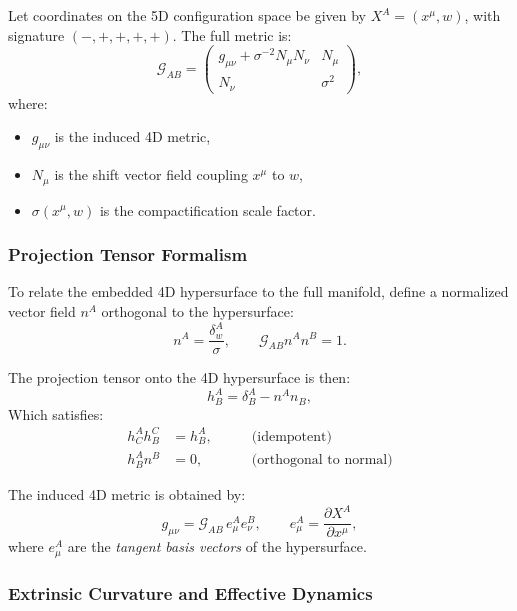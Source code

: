 \documentclass[12pt]{article}
\begin{document}
Let coordinates on the 5D configuration space be given by \(X^A = (x^\mu, w)\), with signature \((-, +, +, +, +)\). The full metric is:
\begin{equation}
\mathcal{G}_{AB} =
\begin{pmatrix}
g_{\mu\nu} + \sigma^{-2} N_\mu N_\nu & N_\mu \\
N_\nu & \sigma^2
\end{pmatrix},
\label{eq:5D_metric}
\end{equation}
where:
\begin{itemize}
    \item \(g_{\mu\nu}\) is the induced 4D metric,
    \item \(N_\mu\) is the shift vector field coupling \(x^\mu\) to \(w\),
    \item \(\sigma(x^\mu, w)\) is the compactification scale factor.
\end{itemize}

\subsubsection*{Projection Tensor Formalism}

To relate the embedded 4D hypersurface to the full manifold, define a normalized vector field \(n^A\) orthogonal to the hypersurface:
\begin{equation}
n^A = \frac{\delta^A_w}{\sigma}, \qquad \mathcal{G}_{AB} n^A n^B = 1.
\end{equation}

The projection tensor onto the 4D hypersurface is then:
\begin{equation}
h^A_B = \delta^A_B - n^A n_B,
\label{eq:proj_tensor}
\end{equation}
Which satisfies:
\begin{align}
h^A_C h^C_B &= h^A_B, \qquad &\text{(idempotent)} \\
h^A_B n^B &= 0, \qquad &\text{(orthogonal to normal)}
\end{align}

The induced 4D metric is obtained by:
\begin{equation}
g_{\mu\nu} = \mathcal{G}_{AB} \, e^A_\mu e^B_\nu, \qquad e^A_\mu = \frac{\partial X^A}{\partial x^\mu},
\end{equation}
where \(e^A_\mu\) are the \emph{tangent basis vectors} of the hypersurface.

\subsubsection*{Extrinsic Curvature and Effective Dynamics}
\end{document}
